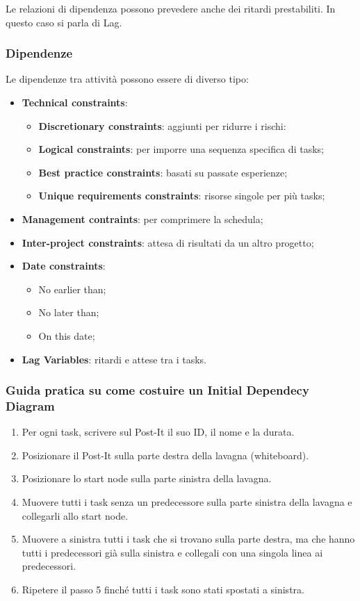 Le relazioni di dipendenza possono prevedere anche dei ritardi prestabiliti. In questo caso si parla di Lag.

\subsubsection{Dipendenze}
Le dipendenze tra attività possono essere di diverso tipo:
\begin{itemize}
	\item \textbf{Technical constraints}:
	\begin{itemize}
		\item \textbf{Discretionary constraints}: aggiunti per ridurre i rischi:
		\item \textbf{Logical constraints}: per imporre una sequenza specifica di tasks;
		\item \textbf{Best practice constraints}: basati su passate esperienze;
		\item \textbf{Unique requirements constraints}: risorse singole per più tasks;
	\end{itemize}
	\item \textbf{Management contraints}: per comprimere la schedula;
	\item \textbf{Inter-project constraints}: attesa di risultati da un altro progetto;
	\item \textbf{Date constraints}:
	\begin{itemize}
		\item No earlier than;
		\item No later than;
		\item On this date;
	\end{itemize}
	\item \textbf{Lag Variables}: ritardi e attese tra i tasks.
\end{itemize}
\subsubsection{Guida pratica su come costuire un Initial Dependecy Diagram}
\begin{enumerate}
	\item Per ogni task, scrivere sul Post-It il suo ID, il nome e la durata.
	\item Posizionare il Post-It sulla parte destra della lavagna (whiteboard).
	\item Posizionare lo start node sulla parte sinistra della lavagna.
	\item Muovere tutti i task senza un predecessore sulla parte sinistra della
	lavagna e collegarli allo start node.
	\item Muovere a sinistra tutti i task che si trovano sulla parte destra, ma che
	hanno tutti i predecessori già sulla sinistra e collegali con una singola
	linea ai predecessori.
	\item Ripetere il passo 5 finché tutti i task sono stati spostati a sinistra.
\end{enumerate}
